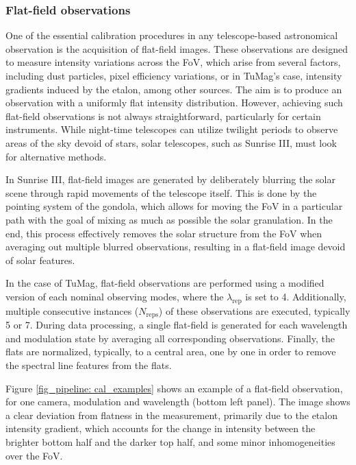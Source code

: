 \subsubsection{Flat-field observations}

One of the essential calibration procedures in any telescope-based astronomical observation is the acquisition of flat-field images. These observations are designed to measure intensity variations across the FoV, which arise from several factors, including dust particles, pixel efficiency variations, or in TuMag's case, intensity gradients induced by the etalon, among other sources. The aim is to produce an observation with a uniformly flat intensity distribution. However, achieving such flat-field observations is not always straightforward, particularly for certain instruments. While night-time telescopes can utilize twilight periods to observe areas of the sky devoid of stars, solar telescopes, such as Sunrise III, must look for alternative methods. 

In Sunrise III, flat-field images are generated by deliberately blurring the solar scene through rapid movements of the telescope itself. This is done by the pointing system of the gondola, which allows for moving the FoV in a particular path with the goal of mixing as much as possible the solar granulation. In the end, this process effectively removes the solar structure from the FoV when averaging out multiple blurred observations, resulting in a flat-field image devoid of solar features.

In the case of TuMag, flat-field observations are performed using a modified version of each nominal observing modes, where the $\lambda_{\text{rep}}$ is set to 4. Additionally, multiple consecutive instances ($N_{\text{reps}}$) of these observations are executed, typically 5 or 7. During data processing, a single flat-field is generated for each wavelength and modulation state by averaging all corresponding observations. Finally, the flats are normalized, typically, to a central area, one by one in order to remove the spectral line features from the flats.

Figure \ref{fig_pipeline: cal_examples} shows an example of a flat-field observation, for one camera, modulation and wavelength (bottom left panel). The image shows a clear deviation from flatness in the measurement, primarily due to the etalon intensity gradient, which accounts for the change in intensity between the brighter bottom half and the darker top half, and some minor inhomogeneities over the FoV. 


